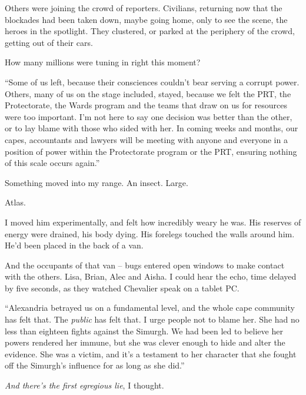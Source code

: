 Others were joining the crowd of reporters.  Civilians, returning now that the blockades had been taken down, maybe going home, only to see the scene, the heroes in the spotlight.  They clustered, or parked at the periphery of the crowd, getting out of their cars.



How many millions were tuning in right this moment?



``Some of us left, because their consciences couldn't bear serving a corrupt power.  Others, many of us on the stage included, stayed, because we felt the PRT, the Protectorate, the Wards program and the teams that draw on us for resources were too important.  I'm not here to say one decision was better than the other, or to lay blame with those who sided with her.  In coming weeks and months, our capes, accountants and lawyers will be meeting with anyone and everyone in a position of power within the Protectorate program or the PRT, ensuring nothing of this scale occurs again.''



Something moved into my range.  An insect.  Large.



Atlas.



I moved him experimentally, and felt how incredibly weary he was.  His reserves of energy were drained, his body dying.  His forelegs touched the walls around him.  He'd been placed in the back of a van.



And the occupants of that van – bugs entered open windows to make contact with the others.  Lisa, Brian, Alec and Aisha.  I could hear the echo, time delayed by five seconds, as they watched Chevalier speak on a tablet PC.



 ``Alexandria betrayed us on a fundamental level, and the whole cape community has felt that.  The\emph{ public} has felt that.  I urge people not to blame her.  She had no less than eighteen fights against the Simurgh.  We had been led to believe her powers rendered her immune, but she was clever enough to hide and alter the evidence.  She was a victim, and it's a testament to her character that she fought off the Simurgh's influence for as long as she did.''



\emph{And there's the first egregious lie}, I thought.




